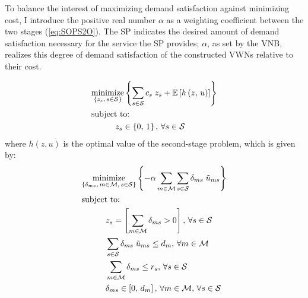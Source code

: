 \documentclass[12pt,dvipsnames]{report}
\begin{document}
To balance the interest of maximizing demand satisfaction against minimizing cost, I introduce the positive real number $\alpha$ as a weighting coefficient between the two stages (\cref{eq:SOPS2O}).  The SP indicates the desired amount of demand satisfaction necessary for the service the SP provides; $\alpha$, as set by the VNB, realizes this degree of demand satisfaction of the constructed VWNs relative to their cost.

\begin{tcolorbox}[floatplacement = !ht, float, title = Two-Stage Stochastic Optimization Program for BS Selection and Adaptive Slicing]
\begin{align}
& \underset{\left\{z_s,\, s \in \mathcal{S}\right\}}{\text{minimize}} \left\{ \sum_{s \in \mathcal{S}} c_s \; z_s + \mathbb{E}\left[ h\left( z,\, u \right) \right] \right\} \label{eq:SOPS1O}\\
& \text{subject to:}  \nonumber \\
& \hspace{0.4in} z_s \in \left\{ 0,\, 1 \right\},\, \forall s \in \mathcal{S} \label{eq:SOPS1C1}
\end{align}
where $h(z, u)$ is the optimal value of the second-stage problem, which is given by:
\begin{align}
& \underset{\left\{ \substack{\delta_{ms},\, m \in \mathcal{M},\, s \in \mathcal{S}} \right\}}{\mathrm{minimize}} \left\{ - \alpha \sum_{m \in \mathcal{M}} \sum_{s \in \mathcal{S}} \delta_{ms} \; \tilde{u}_{ms} \right\} \label{eq:SOPS2O}\\
& \text{subject to:}  \nonumber \\
& \hspace{0.4in} z_s = \left[ \sum_{m \in \mathcal{M}} \delta_{ms} > 0 \right],\, \forall s \in \mathcal{S} \label{eq:SOPS2C1}\\
& \hspace{0.4in} \sum_{s \in \mathcal{S}} \delta_{ms} \; \tilde{u}_{ms} \leq d_m,\, \forall m \in \mathcal{M} \label{eq:SOPS2C2}\\
& \hspace{0.4in} \sum_{m \in \mathcal{M}} \delta_{ms} \leq r_s,\, \forall s \in \mathcal{S} \label{eq:SOPS2C3}\\
& \hspace{0.4in} \delta_{ms} \in \left[ 0,\, d_m \right],\, \forall m \in \mathcal{M},\, \forall s \in \mathcal{S} \label{eq:SOPS2C4}
\end{align}
\end{tcolorbox}
\end{document}
